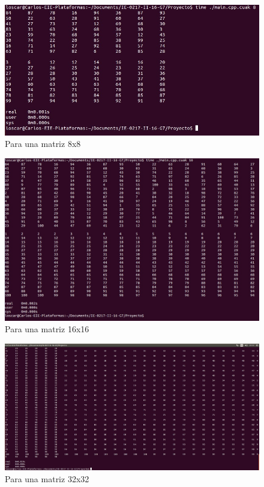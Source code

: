 \documentclass[11pt]{article}
\begin{document}
\begin{figure}[H]
\centering
\includegraphics[scale=1]{8x8.jpg}
\caption{Para una matriz 8x8}
\label{fig:8}
\end{figure}

\begin{figure}[H]
\centering
\includegraphics[scale=0.75]{16x16}
\caption{Para una matriz 16x16}
\label{fig:9}
\end{figure}

\begin{figure}[H]
\centering
\includegraphics[scale=0.5]{32x32.jpg}
\caption{Para una matriz 32x32}
\label{fig:10}
\end{figure}
\end{document}
